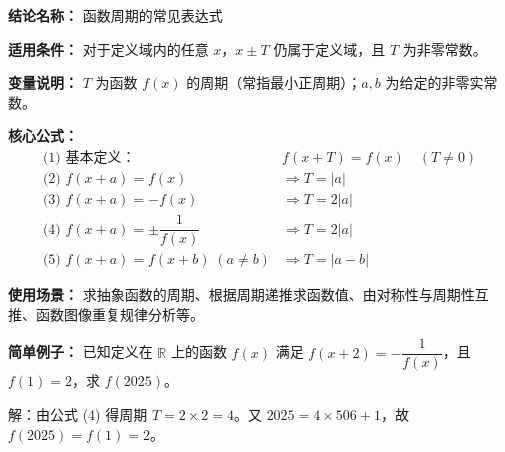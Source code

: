 \textbf{结论名称：} 函数周期的常见表达式

\textbf{适用条件：} 对于定义域内的任意 \(x\)，\(x\pm T\) 仍属于定义域，且 \(T\) 为非零常数。

\textbf{变量说明：} \(T\) 为函数 \(f(x)\) 的周期（常指最小正周期）；\(a, b\) 为给定的非零实常数。

\textbf{核心公式：}
\[
\boxed{
\begin{array}{ll}
\text{(1) 基本定义：} & f(x+T)=f(x)\quad (T\neq 0) \\[4pt]
\text{(2) } f(x+a)=f(x) & \Rightarrow T=|a| \\[4pt]
\text{(3) } f(x+a)=-f(x) & \Rightarrow T=2|a| \\[4pt]
\text{(4) } f(x+a)=\pm\dfrac{1}{f(x)} & \Rightarrow T=2|a| \\[4pt]
\text{(5) } f(x+a)=f(x+b)\;(a\neq b) & \Rightarrow T=|a-b|
\end{array}
}
\]

\textbf{使用场景：} 求抽象函数的周期、根据周期递推求函数值、由对称性与周期性互推、函数图像重复规律分析等。

\textbf{简单例子：} 
已知定义在 \(\mathbb{R}\) 上的函数 \(f(x)\) 满足 \(f(x+2)=-\dfrac{1}{f(x)}\)，且 \(f(1)=2\)，求 \(f(2025)\)。

解：由公式 (4) 得周期 \(T=2\times 2=4\)。又 \(2025=4\times 506+1\)，故 \(f(2025)=f(1)=2\)。